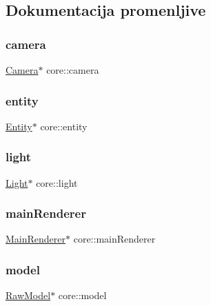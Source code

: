 \subsection{Dokumentacija promenljive}
\mbox{\label{namespacecore_a9d645c490b142886301256f6cf9c65c2}} 
\subsubsection{\texorpdfstring{camera}{camera}}
{\footnotesize\ttfamily \hyperlink{classentity_1_1Camera}{Camera}$\ast$ core\+::camera}

\mbox{\label{namespacecore_aa710c0ea388433d2d80d1d1c67582eda}} 
\subsubsection{\texorpdfstring{entity}{entity}}
{\footnotesize\ttfamily \hyperlink{classentity_1_1Entity}{Entity}$\ast$ core\+::entity}

\mbox{\label{namespacecore_a2324d96000e7c6d42570a0577e8f070b}} 
\subsubsection{\texorpdfstring{light}{light}}
{\footnotesize\ttfamily \hyperlink{classentity_1_1Light}{Light}$\ast$ core\+::light}

\mbox{\label{namespacecore_a01adfda2bbace85dc243e5fba0d93b52}} 
\subsubsection{\texorpdfstring{main\+Renderer}{mainRenderer}}
{\footnotesize\ttfamily \hyperlink{classcore_1_1MainRenderer}{Main\+Renderer}$\ast$ core\+::main\+Renderer}

\mbox{\label{namespacecore_aa1479d4ed4dadbfe085b26662122b68a}} 
\subsubsection{\texorpdfstring{model}{model}}
{\footnotesize\ttfamily \hyperlink{classmodel_1_1RawModel}{Raw\+Model}$\ast$ core\+::model}

